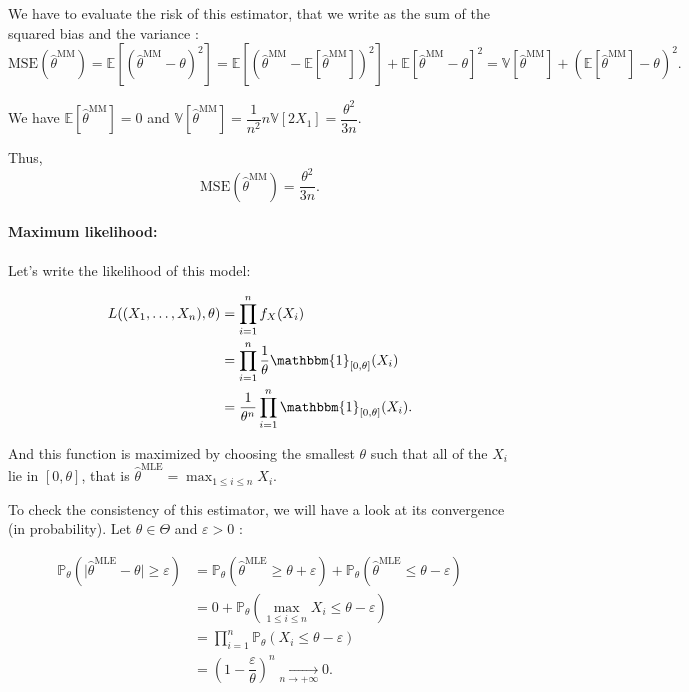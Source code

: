 We have to evaluate the risk of this estimator, that we write as the sum of the squared bias and the variance : $$\text{MSE}(\hat{\theta}^{\text{MM}}) = \mathbb{E}[(\hat{\theta}^{\text{MM}} - \theta)^2] = \mathbb{E}[(\hat{\theta}^{\text{MM}} - \mathbb{E}[\hat{\theta}^{\text{MM}}])^2] + \mathbb{E}[\hat{\theta}^{\text{MM}} - \theta]^2 = \mathbb{V}[\hat{\theta}^{\text{MM}}] + (\mathbb{E}[\hat{\theta}^{\text{MM}}] - \theta)^2.$$

We have $\mathbb{E}[\hat{\theta}^{\text{MM}}] = 0$ and $\mathbb{V}[\hat{\theta}^{\text{MM}}] = \dfrac{1}{n^2}n\mathbb{V}[2X_1] = \dfrac{\theta^2}{3n}.$\newline

Thus, $$\text{MSE}(\hat{\theta}^{\text{MM}}) = \dfrac{\theta^2}{3n}.$$


\paragraph*{Maximum likelihood:}

Let's write the likelihood of this model:

\begin{align*}
    L((X_1,\dots,X_n), \theta) &= \displaystyle \prod_{i=1}^{n} f_X(X_i) \\
    &= \displaystyle \prod_{i=1}^{n} \dfrac{1}{\theta} \mathbbm{1}_{[0, \theta]}(X_i)\\
    &= \dfrac{1}{\theta^n} \prod_{i=1}^{n} \mathbbm{1}_{[0, \theta]}(X_i).
\end{align*}

And this function is maximized by choosing the smallest $\theta$ such that all of the $X_i$ lie in $[0, \theta]$, that is $\hat{\theta}^{\text{MLE}} = \max_{1\leq i \leq n} X_i.$\newline

To check the consistency of this estimator, we will have a look at its convergence (in probability). Let $\theta \in \Theta$ and $\varepsilon >0$ :

\begin{align*}
    \mathbb{P}_\theta(\lvert\hat{\theta}^{\text{MLE}} - \theta\rvert \ge \varepsilon) &= \mathbb{P}_\theta(\hat{\theta}^{\text{MLE}} \ge \theta + \varepsilon) + \mathbb{P}_\theta(\hat{\theta}^{\text{MLE}} \le \theta - \varepsilon)\\
    &= 0 + \mathbb{P}_\theta(\max_{1\leq i \leq n} X_i \le \theta - \varepsilon)\\
    &= \prod_{i=1}^{n} \mathbb{P}_\theta(X_i \le \theta - \varepsilon)\\
    &= \left(1 - \dfrac{\varepsilon}{\theta} \right)^n \underset{n\to +\infty}{\longrightarrow} 0.
\end{align*}


